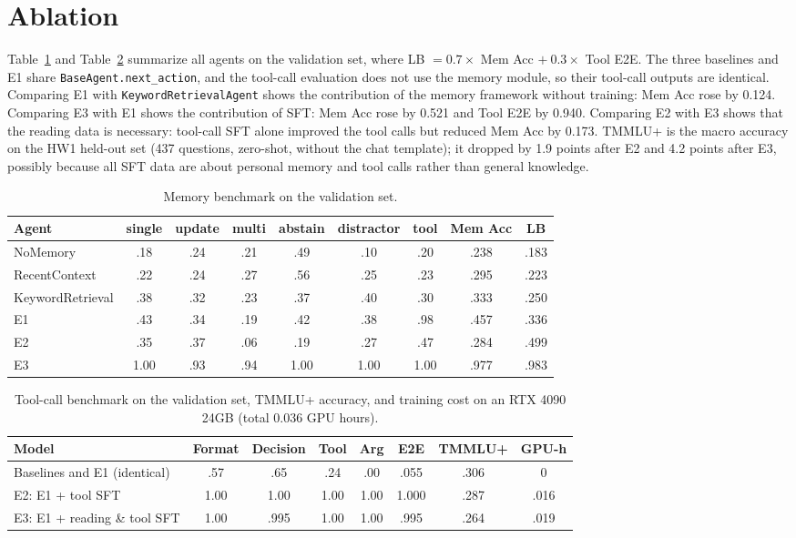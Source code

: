 \documentclass{article}
\begin{document}
\section{Ablation}
Table~\ref{tab:ablmem} and Table~\ref{tab:abltool} summarize all agents on the validation set, where LB $= 0.7\times$ Mem Acc $+\ 0.3\times$ Tool E2E.
The three baselines and E1 share \texttt{BaseAgent.next\_action}, and the tool-call evaluation does not use the memory module, so their tool-call outputs are identical.
Comparing E1 with \texttt{KeywordRetrievalAgent} shows the contribution of the memory framework without training: Mem Acc rose by 0.124.
Comparing E3 with E1 shows the contribution of SFT: Mem Acc rose by 0.521 and Tool E2E by 0.940.
Comparing E2 with E3 shows that the reading data is necessary: tool-call SFT alone improved the tool calls but reduced Mem Acc by 0.173.
TMMLU+ is the macro accuracy on the HW1 held-out set (437 questions, zero-shot, without the chat template); it dropped by 1.9 points after E2 and 4.2 points after E3, possibly because all SFT data are about personal memory and tool calls rather than general knowledge.
\begin{table}[H]
    \centering
    \small
    \begin{tabular}{lcccccccc}
        \toprule
        Agent & single & update & multi & abstain & distractor & tool & Mem Acc & LB \\
        \midrule
        NoMemory         & .18 & .24 & .21 & .49 & .10 & .20 & .238 & .183 \\
        RecentContext    & .22 & .24 & .27 & .56 & .25 & .23 & .295 & .223 \\
        KeywordRetrieval & .38 & .32 & .23 & .37 & .40 & .30 & .333 & .250 \\
        \midrule
        E1 & .43 & .34 & .19 & .42 & .38 & .98 & .457 & .336 \\
        E2 & .35 & .37 & .06 & .19 & .27 & .47 & .284 & .499 \\
        E3 & 1.00 & .93 & .94 & 1.00 & 1.00 & 1.00 & .977 & .983 \\
        \bottomrule
    \end{tabular}
    \caption{Memory benchmark on the validation set.}
    \label{tab:ablmem}
\end{table}

\begin{table}[H]
    \centering
    \small
    \begin{tabular}{lccccccc}
        \toprule
        Model & Format & Decision & Tool & Arg & E2E & TMMLU+ & GPU-h \\
        \midrule
        Baselines and E1 (identical) & .57 & .65 & .24 & .00 & .055 & .306 & 0 \\
        E2: E1 + tool SFT    & 1.00 & 1.00 & 1.00 & 1.00 & 1.000 & .287 & .016 \\
        E3: E1 + reading \& tool SFT & 1.00 & .995 & 1.00 & 1.00 & .995 & .264 & .019 \\
        \bottomrule
    \end{tabular}
    \caption{Tool-call benchmark on the validation set, TMMLU+ accuracy, and training cost on an RTX 4090 24GB (total 0.036 GPU hours).}
    \label{tab:abltool}
\end{table}
\end{document}
